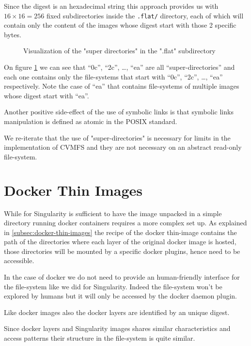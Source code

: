 Since the digest is an hexadecimal string this approach provides us with $16 \times 16 = 256$ fixed subdirectories inside the \texttt{.flat/} directory, each of which will contain only the content of the images whose digest start with those 2 specific bytes.

\begin{figure}
\caption{Visualization of the "super directories" in the ".flat" subdirectory}
\label{fig:super-directories}
\end{figure}

On figure \ref{fig:super-directories} we can see that “0c”, “2c”, …, “ea” are all “super-directories” and each one contains only the file-systems that start with “0c”, “2c”, …, “ea” respectively.
Note the case of “ea” that contains file-systems of multiple images whose digest start with “ea”.

Another positive side-effect of the use of symbolic links is that symbolic links manipulation is defined as atomic in the POSIX standard.

We re-iterate that the use of "super-directories" is necessary for limits in the implementation of CVMFS and they are not necessary on an abstract read-only file-system.

\section{Docker Thin Images}

While for Singularity is sufficient to have the image unpacked in a simple directory running docker containers requires a more complex set up.
As explained in \ref{subsec:docker-thin-images} the recipe of the docker thin-image contains the path of the directories where each layer of the original docker image is hosted, those directories will be mounted by a specific docker plugins, hence need to be accessible.

In the case of docker we do not need to provide an human-friendly interface for the file-system like we did for Singularity. Indeed the file-system won't be explored by humans but it will only be accessed by the docker daemon plugin.

Like docker images also the docker layers are identified by an unique digest.

Since docker layers and Singularity images shares similar characteristics and access patterns their structure in the file-system is quite similar.

